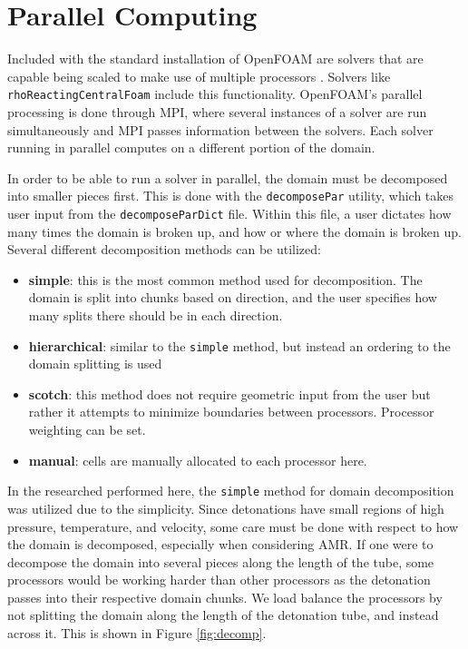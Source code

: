 \section{Parallel Computing}
Included with the standard installation of OpenFOAM are solvers that are capable being scaled to make use of multiple processors \cite{ofug}. Solvers like \verb|rhoReactingCentralFoam| include this functionality. OpenFOAM's parallel processing is done through MPI, where several instances of a solver are run simultaneously and MPI passes information between the solvers. Each solver running in parallel computes on a different portion of the domain. 

In order to be able to run a solver in parallel, the domain must be decomposed into smaller pieces first. This is done with the \verb|decomposePar| utility, which takes user input from the \verb|decomposeParDict| file. Within this file, a user dictates how many times the domain is broken up, and how or where the domain is broken up. Several different decomposition methods can be utilized:
\begin{itemize}
\item \textbf{simple}: this is the most common method used for decomposition. The domain is split into chunks based on direction, and the user specifies how many splits there should be in each direction. 
\item \textbf{hierarchical}: similar to the \verb|simple| method, but instead an ordering to the domain splitting is used
\item \textbf{scotch}: this method does not require geometric input from the user but rather it attempts to minimize boundaries between processors. Processor weighting can be set. 
\item \textbf{manual}: cells are manually allocated to each processor here. 
\end{itemize}
In the researched performed here, the \verb|simple| method for domain decomposition was utilized due to the simplicity. Since detonations have small regions of high pressure, temperature, and velocity, some care must be done with respect to how the domain is decomposed, especially when considering AMR. If one were to decompose the domain into several pieces along the length of the tube, some processors would be working harder than other processors as the detonation passes into their respective domain chunks. We load balance the processors by not splitting the domain along the length of the detonation tube, and instead across it. This is shown in Figure \ref{fig:decomp}. 
